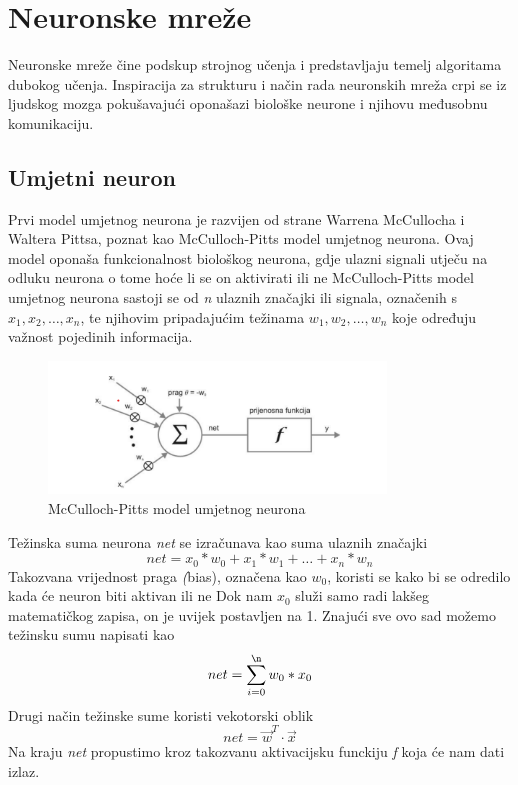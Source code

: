 

\chapter{Neuronske mreže}\label{ch:neuronske-mreze}

Neuronske mreže čine podskup strojnog učenja i predstavljaju temelj algoritama dubokog učenja.
Inspiracija za strukturu i način rada neuronskih mreža crpi se iz ljudskog mozga pokušavajući oponašazi biološke neurone i njihovu međusobnu komunikaciju.


\section{Umjetni neuron}\label{sec:umjetni-neuron}
Prvi model umjetnog neurona je razvijen od strane Warrena McCullocha i Waltera Pittsa, poznat kao McCulloch-Pitts
model umjetnog neurona. Ovaj model oponaša funkcionalnost biološkog neurona, gdje ulazni signali utječu na odluku neurona o tome hoće li
se on aktivirati ili ne
McCulloch-Pitts model umjetnog neurona sastoji se od \textit{n} ulaznih značajki ili signala, označenih s $x_1, x_2, \dots, x_n$, te njihovim pripadajućim težinama $w_1, w_2, \dots, w_n$ koje određuju važnost pojedinih informacija.
\FloatBarrier
\begin{figure}[h]
    \centering
    \includegraphics[width=0.8\textwidth]{images/Umjetni_neuron}
    \caption{McCulloch-Pitts model umjetnog neurona%
    \protect\footnotemark}
    \label{fig:slika1}
\end{figure}
\FloatBarrier
{}

Težinska suma neurona \emph{net} se izračunava kao suma ulaznih značajki
\[ net = x_0*w_0 + x_1*w_1 + \dots + x_n*w_n \]
Takozvana vrijednost praga \emph(bias), označena kao $w_0$, koristi se kako bi se odredilo kada će neuron biti aktivan ili ne
Dok nam $x_0$ služi samo radi lakšeg matematičkog zapisa, on je uvijek postavljen na 1.
Znajući sve ovo sad možemo težinsku sumu napisati kao
\[ net = \sum_{i=0}^{\n} w_0*x_0 \]
Drugi način težinske sume koristi vekotorski oblik
\[ net =\vec{w}^T \cdot \vec{x} \]
Na kraju \textit{net} propustimo kroz takozvanu aktivacijsku funckiju \textit{f} koja će nam dati izlaz.

